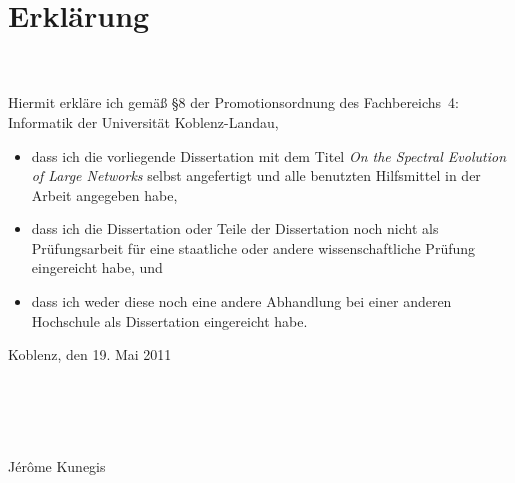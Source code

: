 \documentclass[12pt,german]{scrartcl}
\begin{document}
\section*{Erklärung}

~\\
\\
Hiermit erkläre ich gemäß §8 der Promotionsordnung des Fachbereichs~4:
Informatik der Universität Koblenz-Landau,  

\begin{itemize}
\item dass ich die vorliegende Dissertation mit dem Titel
  \emph{On the Spectral Evolution of Large Networks} selbst angefertigt
  und alle benutzten Hilfsmittel in 
  der Arbeit angegeben habe, 
\item dass ich die Dissertation oder Teile der Dissertation noch nicht
  als Prüfungsarbeit für eine staatliche oder andere wissenschaftliche
  Prüfung eingereicht habe, und
\item dass ich weder diese noch eine andere Abhandlung bei einer anderen
  Hochschule als Dissertation eingereicht habe.\\ 

\end{itemize}
Koblenz, den 19. Mai 2011

~\\
~\\
~\\
~\\
Jérôme Kunegis
\end{document}
